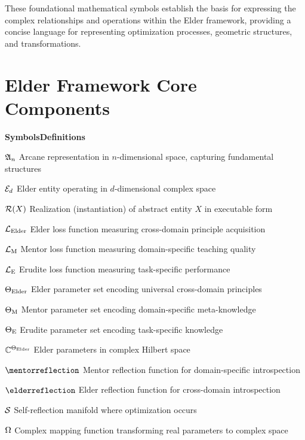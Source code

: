 \vspace{1cm}
\begin{center}
These foundational mathematical symbols establish the basis for expressing the complex relationships and operations within the Elder framework, providing a concise language for representing optimization processes, geometric structures, and transformations.
\end{center}

\clearpage
\chapter*{Elder Framework Core Components}

\begin{multicols}{2}
\noindent\textbf{\large Symbols}\hfill\textbf{\large Definitions}

\vspace{0.3cm}
\noindent$\mathfrak{A}_{n}$ \dotfill Arcane representation in $n$-dimensional space, capturing fundamental structures

\noindent$\mathcal{E}_{d}$ \dotfill Elder entity operating in $d$-dimensional complex space

\noindent$\mathcal{R}(X)$ \dotfill Realization (instantiation) of abstract entity $X$ in executable form

\noindent$\mathcal{L}_{\text{Elder}}$ \dotfill Elder loss function measuring cross-domain principle acquisition

\noindent$\mathcal{L}_{\text{M}}$ \dotfill Mentor loss function measuring domain-specific teaching quality

\noindent$\mathcal{L}_{\text{E}}$ \dotfill Erudite loss function measuring task-specific performance

\noindent$\Theta_{\text{Elder}}$ \dotfill Elder parameter set encoding universal cross-domain principles

\noindent$\Theta_{\text{M}}$ \dotfill Mentor parameter set encoding domain-specific meta-knowledge

\noindent$\Theta_{\text{E}}$ \dotfill Erudite parameter set encoding task-specific knowledge

\noindent$\mathbb{C}^{\Theta_{\text{Elder}}}$ \dotfill Elder parameters in complex Hilbert space

\noindent$\mentorreflection$ \dotfill Mentor reflection function for domain-specific introspection

\noindent$\elderreflection$ \dotfill Elder reflection function for cross-domain introspection

\noindent$\mathcal{S}$ \dotfill Self-reflection manifold where optimization occurs

\noindent$\Omega$ \dotfill Complex mapping function transforming real parameters to complex space
\end{multicols}

